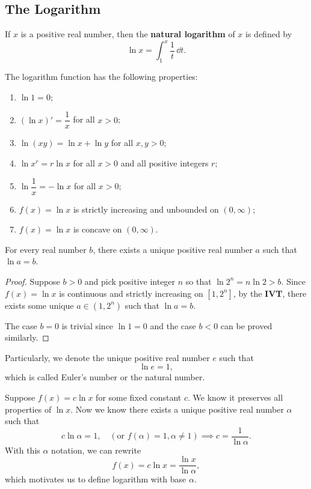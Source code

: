 \documentclass[a4paper]{ctexart}
\begin{document}
	\subsection{The Logarithm}
	\begin{mydef}
		If $x$ is a positive real number, then the \textbf{natural logarithm} of $x$ is defined by
		\[
		\ln x = \int_1^x \frac{1}{t}\, \dd t.
		\]
	\end{mydef}
	\begin{mythm}
		The logarithm function has the following properties:
		\begin{enumerate}
			\item [(1)] $\ln 1 = 0$;
			\item [(2)] $(\ln x)' = \dfrac{1}{x}$ for all $x>0$;
			\item [(3)] $\ln (xy) = \ln x + \ln y$ for all $x,y>0$;
			\item [(4)] $\ln x^r = r \ln x$ for all $x>0$ and all positive integers $r$;
			\item [(5)] $\ln \dfrac{1}{x} = - \ln x$ for all $x>0$;
			\item [(6)] $f(x)=\ln x$ is strictly increasing and unbounded on $(0,\infty)$;
			\item [(7)] $f(x)=\ln x$ is concave on $(0,\infty)$.
		\end{enumerate}
	\end{mythm}
	\begin{mythm}
		For every real number $b$, there exists a unique positive real number $a$ such that $\ln a = b$.
	\end{mythm}
	\begin{proof}
		Suppose $b>0$ and pick positive integer $n$ so that $\ln 2^n = n \ln 2 > b$. Since $f(x) = \ln x$ is continuous and strictly increasing on $[1, 2^n]$, by the \textbf{IVT}, there exists some unique $a\in (1, 2^n)$ such that $\ln a = b$.

		The case $b=0$ is trivial since $\ln 1 = 0$ and the case $b<0$ can be proved similarly.
	\end{proof}
	\begin{mydef}
		Particularly, we denote the unique positive real number $e$ such that
		\[
		\ln e = 1,
		\]
		which is called Euler's number or the natural number.
	\end{mydef}
	\begin{myrmk}
		Suppose $f(x)=c \ln x$ for some fixed constant $c$. We know it preserves all properties of $\ln x$. Now we know there exists a unique positive real number $\alpha$ such that
		\[
		c \ln \alpha = 1,\quad (\text{or }f(\alpha)=1,\alpha \neq 1) \implies c = \frac{1}{\ln \alpha}.
		\]
		With this $\alpha$ notation, we can rewrite
		\[
		f(x) = c \ln x = \frac{\ln x}{\ln \alpha},
		\]
		which motivates us to define logarithm with base $\alpha$.
	\end{myrmk}
\end{document}
